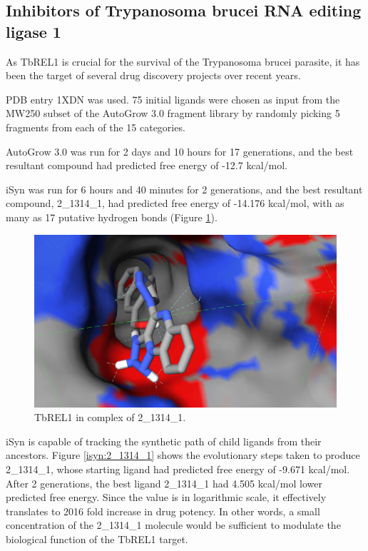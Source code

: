 \subsection{Inhibitors of Trypanosoma brucei RNA editing ligase 1}

As TbREL1 is crucial for the survival of the Trypanosoma brucei parasite, it has been the target of several drug discovery projects over recent years.

PDB entry 1XDN was used. 75 initial ligands were chosen as input from the MW250 subset of the AutoGrow 3.0 fragment library by randomly picking 5 fragments from each of the 15 categories.

AutoGrow 3.0 was run for 2 days and 10 hours for 17 generations, and the best resultant compound had predicted free energy of -12.7 kcal/mol.

iSyn was run for 6 hours and 40 minutes for 2 generations, and the best resultant compound, 2\_1314\_1, had predicted free energy of -14.176 kcal/mol, with as many as 17 putative hydrogen bonds (Figure \ref{isyn:1XDN}).

\begin{figure}
\begin{center}
\includegraphics[width=\linewidth]{../isyn/1XDN.png}
\end{center}
\caption{TbREL1 in complex of 2\_1314\_1.}
\label{isyn:1XDN}
\end{figure}

iSyn is capable of tracking the synthetic path of child ligands from their ancestors. Figure \ref{isyn:2_1314_1} shows the evolutionary steps taken to produce 2\_1314\_1, whose starting ligand had predicted free energy of -9.671 kcal/mol. After 2 generations, the best ligand 2\_1314\_1 had 4.505 kcal/mol lower predicted free energy. Since the value is in logarithmic scale, it effectively translates to 2016 fold increase in drug potency. In other words, a small concentration of the 2\_1314\_1 molecule would be sufficient to modulate the biological function of the TbREL1 target.

